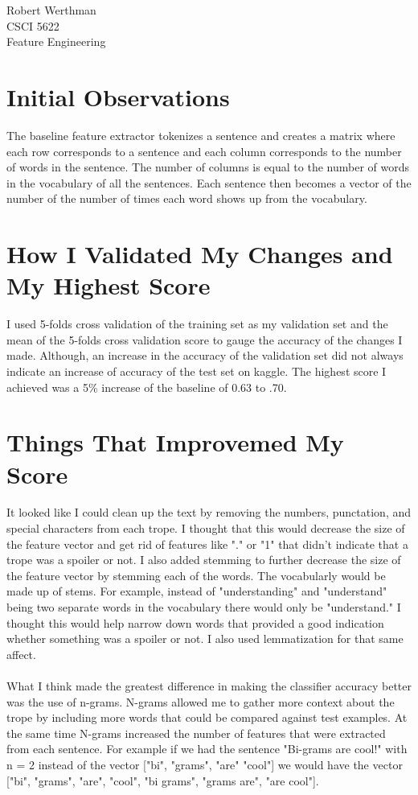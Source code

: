 \documentclass[11pt]{article}
\begin{document}
\noindent
Robert Werthman\\
CSCI 5622\\
Feature Engineering\\

\section*{Initial Observations}
The baseline feature extractor tokenizes a sentence and creates a matrix where each row corresponds to a sentence and each column corresponds to the number of words in the sentence.  The number of columns is equal to the number of words in the vocabulary of all the sentences.  Each sentence then becomes a vector of the number of the number of times each word shows up from the vocabulary.

\section*{How I Validated My Changes and My Highest Score}
I used 5-folds cross validation of the training set as my validation set and the mean of the 5-folds cross validation score to gauge the accuracy of the changes I made.  Although, an increase in the accuracy of the validation set did not always indicate an increase of accuracy of the test set on kaggle.  The highest score I achieved was a 5\% increase of the baseline of 0.63 to .70.

\section*{Things That Improvemed My Score}
It looked like I could clean up the text by removing the numbers, punctation, and special characters from each trope.  I thought that this would decrease the size of the feature vector and get rid of features like "." or "1" that didn't indicate that a trope was a spoiler or not.  I also added stemming to further decrease the size of the feature vector by stemming each of the words.  The vocabularly would be made up of stems.  For example, instead of "understanding" and "understand" being two separate words in the vocabulary there would only be "understand."  I thought this would help narrow down words that provided a good indication whether something was a spoiler or not.  I also used lemmatization for that same affect.
\\ \\
What I think made the greatest difference in making the classifier accuracy better was the use of n-grams.  N-grams allowed me to gather more context about the trope by including more words that could be compared against test examples.  At the same time N-grams increased the number of features that were extracted from each sentence.  For example if we had the sentence "Bi-grams are cool!" with n = 2 instead of the vector ["bi", "grams", "are" "cool"] we would have the vector ["bi", "grams", "are", "cool", "bi grams", "grams are", "are cool"]. 
\end{document}
